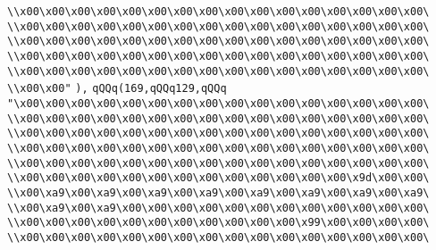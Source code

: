 \verb|\\x00\x00\x00\x00\x00\x00\x00\x00\x00\x00\x00\x00\x00\x00\x00\x00\|\newline
\verb|\\x00\x00\x00\x00\x00\x00\x00\x00\x00\x00\x00\x00\x00\x00\x00\x00\|\newline
\verb|\\x00\x00\x00\x00\x00\x00\x00\x00\x00\x00\x00\x00\x00\x00\x00\x00\|\newline
\verb|\\x00\x00\x00\x00\x00\x00\x00\x00\x00\x00\x00\x00\x00\x00\x00\x00\|\newline
\verb|\\x00\x00\x00\x00\x00\x00\x00\x00\x00\x00\x00\x00\x00\x00\x00\x00\|\newline
\verb|\\x00\x00"|\newline
\verb|),|\newline
\verb|qQQq(169,qQQq129,qQQq|\newline
\verb|"\x00\x00\x00\x00\x00\x00\x00\x00\x00\x00\x00\x00\x00\x00\x00\x00\|\newline
\verb|\\x00\x00\x00\x00\x00\x00\x00\x00\x00\x00\x00\x00\x00\x00\x00\x00\|\newline
\verb|\\x00\x00\x00\x00\x00\x00\x00\x00\x00\x00\x00\x00\x00\x00\x00\x00\|\newline
\verb|\\x00\x00\x00\x00\x00\x00\x00\x00\x00\x00\x00\x00\x00\x00\x00\x00\|\newline
\verb|\\x00\x00\x00\x00\x00\x00\x00\x00\x00\x00\x00\x00\x00\x00\x00\x00\|\newline
\verb|\\x00\x00\x00\x00\x00\x00\x00\x00\x00\x00\x00\x00\x00\x9d\x00\x00\|\newline
\verb|\\x00\xa9\x00\xa9\x00\xa9\x00\xa9\x00\xa9\x00\xa9\x00\xa9\x00\xa9\|\newline
\verb|\\x00\xa9\x00\xa9\x00\x00\x00\x00\x00\x00\x00\x00\x00\x00\x00\x00\|\newline
\verb|\\x00\x00\x00\x00\x00\x00\x00\x00\x00\x00\x00\x99\x00\x00\x00\x00\|\newline
\verb|\\x00\x00\x00\x00\x00\x00\x00\x00\x00\x00\x00\x00\x00\x00\x00\x00\|\newline
